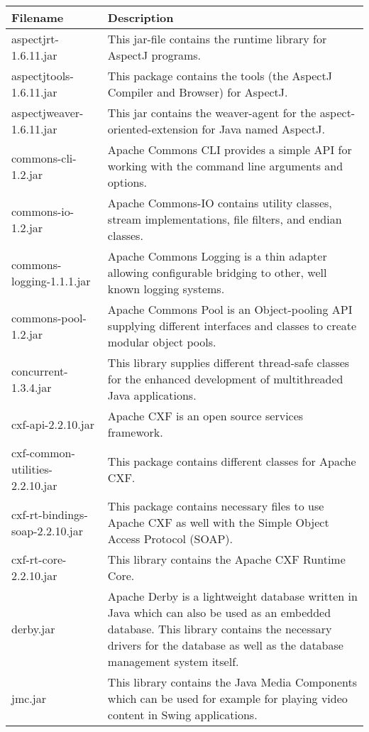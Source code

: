 \begin{center}
\begin{longtable}{|p{}|p{}|}
\hline 
Filename & Description\\
\hline
\hline 
aspectjrt-1.6.11.jar & This jar-file contains the runtime library for AspectJ programs.\\
\hline 
aspectjtools-1.6.11.jar & This package contains the tools (the AspectJ Compiler and Browser) for AspectJ.\\
\hline 
aspectjweaver-1.6.11.jar & This jar contains the weaver-agent for the aspect-oriented-extension for Java named AspectJ.\\
\hline 
commons-cli-1.2.jar & Apache Commons CLI provides a simple API for working with the command line arguments and options.\\
\hline 
commons-io-1.2.jar & Apache Commons-IO contains utility classes, stream implementations, file filters, and endian classes.\\
\hline 
commons-logging-1.1.1.jar & Apache Commons Logging is a thin adapter allowing configurable bridging to other, well known logging systems.\\
\hline 
commons-pool-1.2.jar & Apache Commons Pool is an Object-pooling API supplying different interfaces and classes to create modular object pools.\\
\hline 
concurrent-1.3.4.jar & This library supplies different thread-safe classes for the enhanced development of multithreaded Java applications.\\
\hline 
cxf-api-2.2.10.jar & Apache CXF is an open source services framework.  \\
\hline 
cxf-common-utilities-2.2.10.jar & This package contains different classes for Apache CXF.\\
\hline 
cxf-rt-bindings-soap-2.2.10.jar & This package contains necessary files to use Apache CXF as well with the Simple Object Access Protocol (SOAP).\\
\hline 
cxf-rt-core-2.2.10.jar & This library contains the Apache CXF Runtime Core. \\
\hline 
derby.jar & Apache Derby is a lightweight database written in Java which can also be used as an embedded database. This library contains the necessary drivers for the database as well as the database management system itself.\\
\hline 
jmc.jar & This library contains the Java Media Components which can be used for example for playing video content in Swing applications.\\

\end{longtable}
\end{center}
